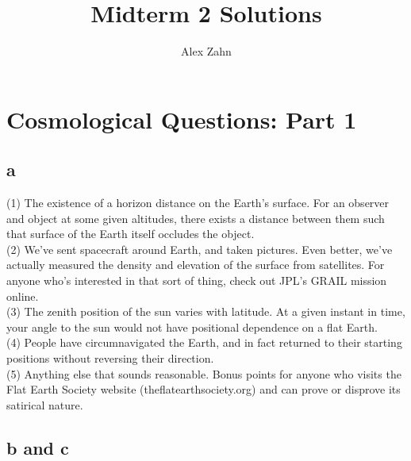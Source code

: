 \documentclass[12pt]{article}
\begin{document}
\newcommand{\mpc}{\mathrm{Mpc}}
\newcommand{\km}{\mathrm{km}}
\newcommand{\solarmass}{M_{\odot}}
\newcommand{\s}{\mathrm{sec}}
\newcommand{\is}{\sec^{-1}}
\newcommand{\ikm}{\km^{-1}}
\newcommand{\impc}{\mpc^{-1}}

\newcommand{\reh}{r_\mathrm{eh}}
\newcommand{\rh}{t_\mathrm{h}}
\newcommand{\el}{\epsilon_\Lambda}

\title{Midterm 2 Solutions}
\author{Alex Zahn}
\maketitle

\section{Cosmological Questions: Part 1}

\subsection*{a}

\noindent (1) The existence of a horizon distance on the Earth's surface. For an observer and object at some given altitudes, there exists a distance between them such that surface of the Earth itself occludes the object. \\
 
\noindent(2) We've sent spacecraft around Earth, and taken pictures. Even better, we've actually measured the density and elevation of the surface from satellites. For anyone who's interested in that sort of thing, check out JPL's GRAIL mission online. \\

\noindent(3) The zenith position of the sun varies with latitude. At a given instant in time, your angle to the sun would not have positional dependence on a flat Earth. \\

\noindent (4) People have circumnavigated the Earth, and in fact returned to their starting positions without reversing their direction. \\

\noindent (5) Anything else that sounds reasonable. Bonus points for anyone who visits the Flat Earth Society website (theflatearthsociety.org) and can prove or disprove its satirical nature.

\subsection{b and c}
\end{document}
